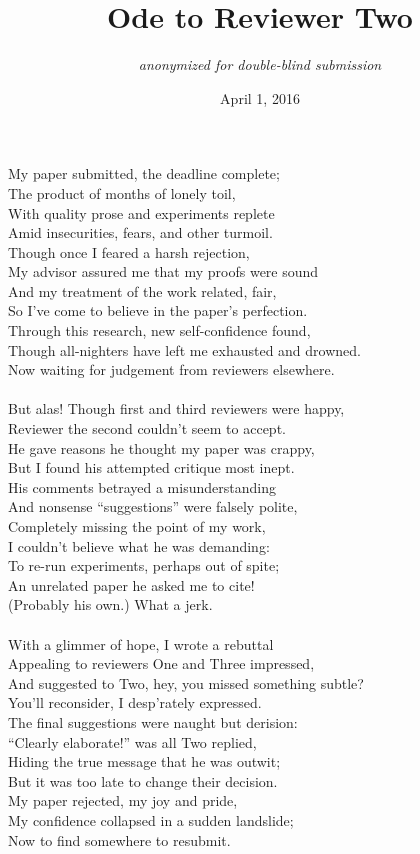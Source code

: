 \documentclass{article}
\title{Ode to Reviewer Two}
\author{{\em anonymized for double-blind submission}}
\date{April 1, 2016}
\begin{document}
\maketitle
\thispagestyle{empty}

\noindent
My paper submitted, the deadline complete;\\
The product of months of lonely toil,\\
With quality prose and experiments replete\\
Amid insecurities, fears, and other turmoil.\\
Though once I feared a harsh rejection,\\
My advisor assured me that my proofs were sound\\
And my treatment of the work related, fair,\\
So I've come to believe in the paper's perfection.\\
Through this research, new self-confidence found,\\
Though all-nighters have left me exhausted and drowned.\\
Now waiting for judgement from reviewers elsewhere.\\
\\
But alas! Though first and third reviewers were happy,\\
Reviewer the second couldn't seem to accept.\\
He gave reasons he thought my paper was crappy,\\
But I found his attempted critique most inept.\\
His comments betrayed a misunderstanding\\
And nonsense ``suggestions'' were falsely polite,\\
Completely missing the point of my work,\\
I couldn't believe what he was demanding:\\
To re-run experiments, perhaps out of spite;\\
An unrelated paper he asked me to cite!\\
(Probably his own.) What a jerk.\\
\\
With a glimmer of hope, I wrote a rebuttal\\
Appealing to reviewers One and Three impressed,\\
And suggested to Two, hey, you missed something subtle?\\
You'll reconsider, I desp'rately expressed.\\
The final suggestions were naught but derision:\\
``Clearly elaborate!'' was all Two replied,\\
Hiding the true message that he was outwit;\\
But it was too late to change their decision.\\
My paper rejected, my joy and pride,\\
My confidence collapsed in a sudden landslide;\\
Now to find somewhere to resubmit.\\
\end{document}
